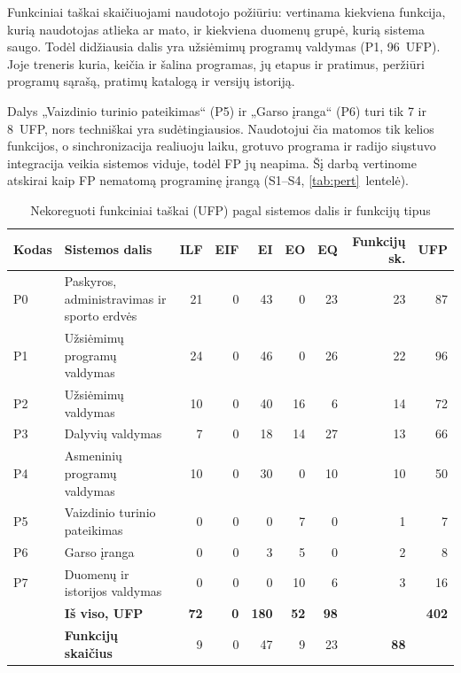 Funkciniai taškai skaičiuojami naudotojo požiūriu: vertinama kiekviena funkcija,
kurią naudotojas atlieka ar mato, ir kiekviena duomenų grupė, kurią sistema
saugo. Todėl didžiausia dalis yra užsiėmimų programų valdymas (P1, 96~UFP).
Joje treneris kuria, keičia ir šalina programas, jų etapus ir pratimus,
peržiūri programų sąrašą, pratimų katalogą ir versijų istoriją.

Dalys „Vaizdinio turinio pateikimas“ (P5) ir „Garso įranga“ (P6) turi tik 7 ir
8~UFP, nors techniškai yra sudėtingiausios. Naudotojui čia matomos tik kelios
funkcijos, o sinchronizacija realiuoju laiku, grotuvo programa ir radijo
siųstuvo integracija veikia sistemos viduje, todėl FP jų neapima. Šį darbą
vertinome atskirai kaip FP nematomą programinę įrangą (S1--S4,
\ref{tab:pert}~lentelė).


\begin{table}[H]
  \centering
  \caption{Nekoreguoti funkciniai taškai (UFP) pagal sistemos dalis ir funkcijų tipus}
  \label{tab:fp}
  \small
  \begin{tabularx}{\textwidth}{@{}lXrrrrrrr@{}}
    \toprule
    \textbf{Kodas} & \textbf{Sistemos dalis} & \textbf{ILF} & \textbf{EIF} & \textbf{EI} & \textbf{EO} & \textbf{EQ} & \textbf{Funkcijų sk.} & \textbf{UFP} \\
    \midrule
    P0 & Paskyros, administravimas ir sporto erdvės & 21 & 0 & 43 & 0 & 23 & 23 & 87 \\
    P1 & Užsiėmimų programų valdymas & 24 & 0 & 46 & 0 & 26 & 22 & 96 \\
    P2 & Užsiėmimų valdymas & 10 & 0 & 40 & 16 & 6 & 14 & 72 \\
    P3 & Dalyvių valdymas & 7 & 0 & 18 & 14 & 27 & 13 & 66 \\
    P4 & Asmeninių programų valdymas & 10 & 0 & 30 & 0 & 10 & 10 & 50 \\
    P5 & Vaizdinio turinio pateikimas & 0 & 0 & 0 & 7 & 0 & 1 & 7 \\
    P6 & Garso įranga & 0 & 0 & 3 & 5 & 0 & 2 & 8 \\
    P7 & Duomenų ir istorijos valdymas & 0 & 0 & 0 & 10 & 6 & 3 & 16 \\
    \midrule
    & \textbf{Iš viso, UFP} & \textbf{72} & \textbf{0} & \textbf{180} & \textbf{52} & \textbf{98} & & \textbf{402} \\
    & \textbf{Funkcijų skaičius} & 9 & 0 & 47 & 9 & 23 & \textbf{88} & \\
    \bottomrule
  \end{tabularx}
\end{table}

